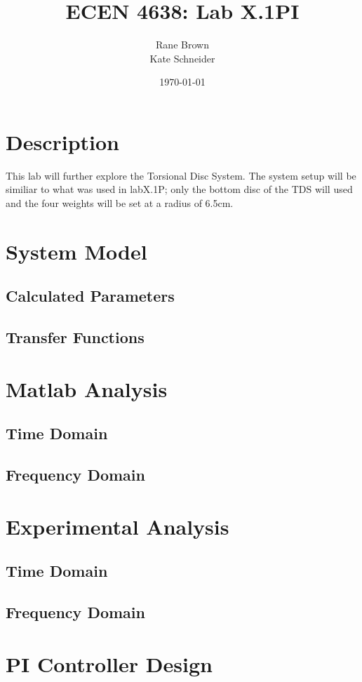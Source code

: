 \documentclass[11pt,titlepage]{article}
\author{Rane Brown \\ Kate Schneider}
\title{ECEN 4638: Lab X.1PI}
\date{\today}
\begin{document}
\maketitle
\tableofcontents
\listoffigures
\newpage

\section{Description}
    This lab will further explore the Torsional Disc System. The system setup will be similiar to what was used in labX.1P; only the bottom disc of the TDS will used and the four weights will be set at a radius of 6.5cm.

\section{System Model}
    \subsection{Calculated Parameters}

    \subsection{Transfer Functions}

\section{Matlab Analysis}
    \subsection{Time Domain}

    \subsection{Frequency Domain}

\section{Experimental Analysis}
    \subsection{Time Domain}

    \subsection{Frequency Domain}

\section{PI Controller Design}
\end{document}
